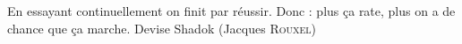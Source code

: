 
%
\null{}
%
\begin{otherlanguage}{french}
%
\cleanchapterquote%
{
    En essayant continuellement on finit par réussir. Donc : plus ça rate, plus on a de chance que ça marche.
}%
{
    Devise Shadok (Jacques \textsc{Rouxel})
}%
{
}
%
\end{otherlanguage}
%
\null
